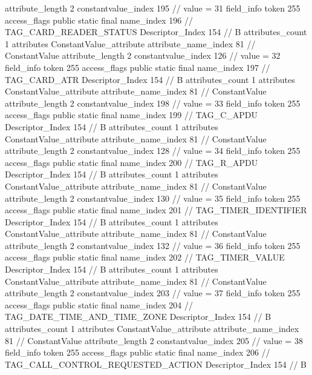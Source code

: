{{{{{{{					attribute_length	2
					constantvalue_index	195		// value = 31
				}
				}
			}
			field_info {
				token	255
				access_flags	public static final
				name_index	196		// TAG_CARD_READER_STATUS
				Descriptor_Index	154		// B
				attributes_count	1
				attributes {
				ConstantValue_attribute {
					attribute_name_index	81		// ConstantValue
					attribute_length	2
					constantvalue_index	126		// value = 32
				}
				}
			}
			field_info {
				token	255
				access_flags	public static final
				name_index	197		// TAG_CARD_ATR
				Descriptor_Index	154		// B
				attributes_count	1
				attributes {
				ConstantValue_attribute {
					attribute_name_index	81		// ConstantValue
					attribute_length	2
					constantvalue_index	198		// value = 33
				}
				}
			}
			field_info {
				token	255
				access_flags	public static final
				name_index	199		// TAG_C_APDU
				Descriptor_Index	154		// B
				attributes_count	1
				attributes {
				ConstantValue_attribute {
					attribute_name_index	81		// ConstantValue
					attribute_length	2
					constantvalue_index	128		// value = 34
				}
				}
			}
			field_info {
				token	255
				access_flags	public static final
				name_index	200		// TAG_R_APDU
				Descriptor_Index	154		// B
				attributes_count	1
				attributes {
				ConstantValue_attribute {
					attribute_name_index	81		// ConstantValue
					attribute_length	2
					constantvalue_index	130		// value = 35
				}
				}
			}
			field_info {
				token	255
				access_flags	public static final
				name_index	201		// TAG_TIMER_IDENTIFIER
				Descriptor_Index	154		// B
				attributes_count	1
				attributes {
				ConstantValue_attribute {
					attribute_name_index	81		// ConstantValue
					attribute_length	2
					constantvalue_index	132		// value = 36
				}
				}
			}
			field_info {
				token	255
				access_flags	public static final
				name_index	202		// TAG_TIMER_VALUE
				Descriptor_Index	154		// B
				attributes_count	1
				attributes {
				ConstantValue_attribute {
					attribute_name_index	81		// ConstantValue
					attribute_length	2
					constantvalue_index	203		// value = 37
				}
				}
			}
			field_info {
				token	255
				access_flags	public static final
				name_index	204		// TAG_DATE_TIME_AND_TIME_ZONE
				Descriptor_Index	154		// B
				attributes_count	1
				attributes {
				ConstantValue_attribute {
					attribute_name_index	81		// ConstantValue
					attribute_length	2
					constantvalue_index	205		// value = 38
				}
				}
			}
			field_info {
				token	255
				access_flags	public static final
				name_index	206		// TAG_CALL_CONTROL_REQUESTED_ACTION
				Descriptor_Index	154		// B
}}}}}
